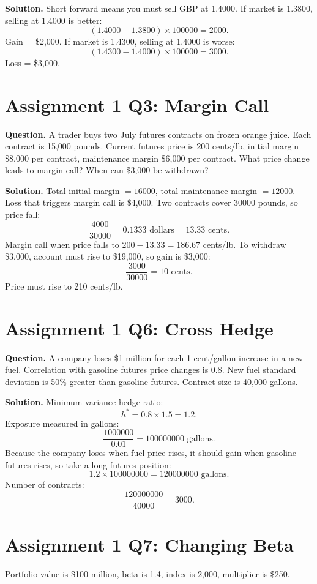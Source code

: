 \documentclass[11pt,a4paper,openany]{ctexbook}
\begin{document}
\textbf{Solution.} Short forward means you must sell GBP at 1.4000. If market is 1.3800, selling at 1.4000 is better:
\[
(1.4000-1.3800)\times100000=2000.
\]
Gain = \$2,000. If market is 1.4300, selling at 1.4000 is worse:
\[
(1.4300-1.4000)\times100000=3000.
\]
Loss = \$3,000.

\section{Assignment 1 Q3: Margin Call}
\textbf{Question.} A trader buys two July futures contracts on frozen orange juice. Each contract is 15,000 pounds. Current futures price is 200 cents/lb, initial margin \$8,000 per contract, maintenance margin \$6,000 per contract. What price change leads to margin call? When can \$3,000 be withdrawn?

\textbf{Solution.} Total initial margin $=16000$, total maintenance margin $=12000$. Loss that triggers margin call is \$4,000. Two contracts cover $30000$ pounds, so price fall:
\[
\frac{4000}{30000}=0.1333\text{ dollars}=13.33\text{ cents}.
\]
Margin call when price falls to $200-13.33=186.67$ cents/lb. To withdraw \$3,000, account must rise to \$19,000, so gain is \$3,000:
\[
\frac{3000}{30000}=10\text{ cents}.
\]
Price must rise to 210 cents/lb.

\section{Assignment 1 Q6: Cross Hedge}
\textbf{Question.} A company loses \$1 million for each 1 cent/gallon increase in a new fuel. Correlation with gasoline futures price changes is 0.8. New fuel standard deviation is 50\% greater than gasoline futures. Contract size is 40,000 gallons.

\textbf{Solution.} Minimum variance hedge ratio:
\[
h^\ast=0.8\times1.5=1.2.
\]
Exposure measured in gallons:
\[
\frac{1000000}{0.01}=100000000\text{ gallons}.
\]
Because the company loses when fuel price rises, it should gain when gasoline futures rises, so take a long futures position:
\[
1.2\times100000000=120000000\text{ gallons}.
\]
Number of contracts:
\[
\frac{120000000}{40000}=3000.
\]

\section{Assignment 1 Q7: Changing Beta}
Portfolio value is \$100 million, beta is 1.4, index is 2,000, multiplier is \$250.
\end{document}
